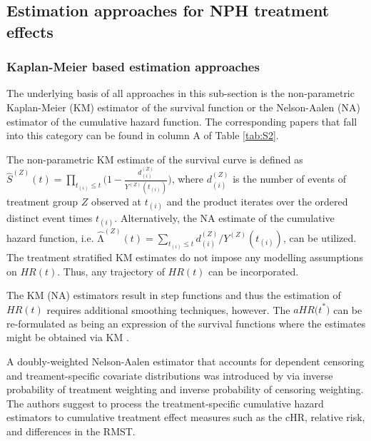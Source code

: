
\subsection{Estimation approaches for NPH treatment effects}

\subsubsection{Kaplan-Meier based estimation approaches} \label{KM_est}

\noindent 

\noindent The underlying basis of all approaches in this sub-section is the non-parametric Kaplan-Meier (KM) estimator of the survival function or the Nelson-Aalen (NA) estimator of the cumulative hazard function. The corresponding papers that fall into this category can be found in column A of Table \ref{tab:S2}. 

\noindent The non-parametric KM estimate of the survival curve is defined as $\hat{S}^{(Z)}\left(t\right)=\prod_{t_{\left(i\right)}\le t}{\bigg(1-\frac{d^{(Z)}_{(i)}}{Y^{(Z)}\left(t_{(i)}\right)}\bigg)}$, where $d^{(Z)}_{(i)}$ is the number of events of treatment group $Z$ observed at $t_{\left(i\right)}$ and the product iterates over the ordered distinct event times $t_{\left(i\right)}$. Alternatively, the NA estimate of the cumulative hazard function, i.e.  ${\widehat{\mathrm{\Lambda }}}^{\left(Z\right)}\left(t\right)=\sum_{t_{\left(i\right)}\le t}{{d^{(Z)}_{\left(i\right)}}/{Y^{(Z)}\left(t_{\left(i\right)}\right)}}$, can be utilized. The treatment stratified KM estimates do not impose any modelling assumptions on $HR\left(t\right)$. Thus, any trajectory of $HR\left(t\right)$ can be incorporated. 

\noindent 

\noindent The KM (NA) estimators result in step functions and thus the estimation of $HR\left(t\right)$ requires additional smoothing techniques, however. The $aHR{(t}^*)$ can be re-formulated as being an expression of the survival functions where the estimates might be obtained via KM \cite{Rauch.2018}. 

\noindent A doubly-weighted Nelson-Aalen estimator that accounts for dependent censoring and treament-specific covariate distributions was introduced by \cite{Schaubel.2011} via inverse probability of treatment weighting and inverse probability of censoring weighting. 
The authors suggest to process the treatment-specific cumulative hazard estimators to cumulative treatment effect measures such as the cHR, relative risk, and differences in the RMST.

